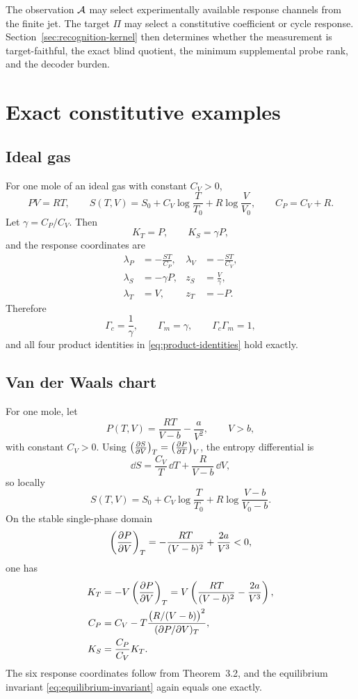 The observation $\mathcal A$ may select experimentally available response channels from the finite jet.  The target $\Pi$ may select a constitutive coefficient or cycle response.  Section~\ref{sec:recognition-kernel} then determines whether the measurement is target-faithful, the exact blind quotient, the minimum supplemental probe rank, and the decoder burden.

\section{Exact constitutive examples}

\subsection{Ideal gas}

For one mole of an ideal gas with constant $C_V>0$,
\[
PV=RT,
\qquad
S(T,V)=S_0+C_V\log\frac{T}{T_0}
+R\log\frac{V}{V_0},
\qquad
C_P=C_V+R.
\]
Let $\gamma=C_P/C_V$.  Then
\[
K_T=P,
\qquad
K_S=\gamma P,
\]
and the response coordinates are
\begin{align*}
\lambda_P&=-\frac{ST}{C_P},&
\lambda_V&=-\frac{ST}{C_V},\\
\lambda_S&=-\gamma P,&
z_S&=\frac{V}{\gamma},\\
\lambda_T&=V,&
z_T&=-P.
\end{align*}
Therefore
\[
\Gamma_c=\frac1\gamma,
\qquad
\Gamma_m=\gamma,
\qquad
\Gamma_c\Gamma_m=1,
\]
and all four product identities in \eqref{eq:product-identities} hold exactly.

\subsection{Van der Waals chart}

For one mole, let
\[
P(T,V)=\frac{RT}{V-b}-\frac{a}{V^2},
\qquad
V>b,
\]
with constant $C_V>0$.  Using $\left(\frac{\partial S}{\partial V}\right)_{T}=\left(\frac{\partial P}{\partial T}\right)_{V}$, the entropy differential is
\[
\dd S=\frac{C_V}{T}\,\dd T+\frac{R}{V-b}\,\dd V,
\]
so locally
\[
S(T,V)=S_0+C_V\log\frac{T}{T_0}
+R\log\frac{V-b}{V_0-b}.
\]
On the stable single-phase domain
\[
\left(\frac{\partial P}{\partial V}\right)_{T}
=-\frac{RT}{(V-b)^2}+\frac{2a}{V^3}<0,
\]
one has
\begin{align*}
K_T
&=-V\left(\frac{\partial P}{\partial V}\right)_{T}
=V\left(\frac{RT}{(V-b)^2}-\frac{2a}{V^3}\right),\\
C_P
&=C_V
-T\frac{\bigl(R/(V-b)\bigr)^2}{(\partial P/\partial V)_T},\\
K_S&=\frac{C_P}{C_V}K_T.
\end{align*}
The six response coordinates follow from Theorem~3.2, and the equilibrium invariant \eqref{eq:equilibrium-invariant} again equals one exactly.


